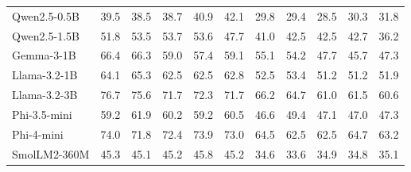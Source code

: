 \documentclass[letterpaper]{article} %
\begin{document}
\begin{table}[t]
{\begin{tabular}{lccccc|ccccc}
Qwen2.5-0.5B & \cellcolor[HTML]{F8DACC}39.5 & \cellcolor[HTML]{F8DACC}38.5 & \cellcolor[HTML]{FADFCC}38.7 & \cellcolor[HTML]{FBE4CC}40.9 & \cellcolor[HTML]{FBE5CC}42.1 & \cellcolor[HTML]{F8D9CC}29.8 & \cellcolor[HTML]{F8DBCC}29.4 & \cellcolor[HTML]{F9DCCC}28.5 & \cellcolor[HTML]{FAE2CC}30.3 & \cellcolor[HTML]{FBE4CC}31.8 \\
Qwen2.5-1.5B & \cellcolor[HTML]{FDECCC}51.8 & \cellcolor[HTML]{FEF2CC}53.5 & \cellcolor[HTML]{FCF1CD}53.7 & \cellcolor[HTML]{FAF1CD}53.6 & \cellcolor[HTML]{FEEDCC}47.7 & \cellcolor[HTML]{FDEACC}41.0 & \cellcolor[HTML]{FEF0CC}42.5 & \cellcolor[HTML]{FFF2CC}42.5 & \cellcolor[HTML]{FCF1CD}42.7 & \cellcolor[HTML]{FDEBCC}36.2 \\
Gemma-3-1B & \cellcolor[HTML]{EFEFCF}66.4 & \cellcolor[HTML]{E9EDD0}66.3 & \cellcolor[HTML]{F4F0CE}59.0 & \cellcolor[HTML]{F4F0CE}57.4 & \cellcolor[HTML]{F3EFCE}59.1 & \cellcolor[HTML]{F3EFCE}55.1 & \cellcolor[HTML]{EEEECF}54.2 & \cellcolor[HTML]{F8F0CD}47.7 & \cellcolor[HTML]{F7F0CD}45.7 & \cellcolor[HTML]{F6F0CE}47.3 \\
Llama-3.2-1B & \cellcolor[HTML]{F3EFCE}64.1 & \cellcolor[HTML]{EBEED0}65.3 & \cellcolor[HTML]{EFEFCF}62.5 & \cellcolor[HTML]{EDEECF}62.5 & \cellcolor[HTML]{EDEECF}62.8 & \cellcolor[HTML]{F6F0CE}52.5 & \cellcolor[HTML]{EFEFCF}53.4 & \cellcolor[HTML]{F2EFCE}51.2 & \cellcolor[HTML]{EFEFCF}51.2 & \cellcolor[HTML]{EFEFCF}51.9 \\
Llama-3.2-3B & \cellcolor[HTML]{E0EBD2}76.7 & \cellcolor[HTML]{DAEAD3}75.6 & \cellcolor[HTML]{E1ECD2}71.7 & \cellcolor[HTML]{DEEBD2}72.3 & \cellcolor[HTML]{E0EBD2}71.7 & \cellcolor[HTML]{E2ECD1}66.2 & \cellcolor[HTML]{DDEBD2}64.7 & \cellcolor[HTML]{E4ECD1}61.0 & \cellcolor[HTML]{DFEBD2}61.5 & \cellcolor[HTML]{E2ECD1}60.6 \\
Phi-3.5-mini & \cellcolor[HTML]{FAF1CD}59.2 & \cellcolor[HTML]{F1EFCF}61.9 & \cellcolor[HTML]{F2EFCE}60.2 & \cellcolor[HTML]{F2EFCE}59.2 & \cellcolor[HTML]{F0EFCF}60.5 & \cellcolor[HTML]{FFF2CC}46.6 & \cellcolor[HTML]{F6F0CE}49.4 & \cellcolor[HTML]{F8F1CD}47.1 & \cellcolor[HTML]{F5F0CE}47.0 & \cellcolor[HTML]{F6F0CE}47.3 \\
Phi-4-mini & \cellcolor[HTML]{E4ECD1}74.0 & \cellcolor[HTML]{E0ECD2}71.8 & \cellcolor[HTML]{E0EBD2}72.4 & \cellcolor[HTML]{DCEBD2}73.9 & \cellcolor[HTML]{DEEBD2}73.0 & \cellcolor[HTML]{E5ECD1}64.5 & \cellcolor[HTML]{E0ECD2}62.5 & \cellcolor[HTML]{E1ECD1}62.5 & \cellcolor[HTML]{DAEAD3}64.7 & \cellcolor[HTML]{DEEBD2}63.2 \\
SmolLM2-360M & \cellcolor[HTML]{FAE2CC}45.3 & \cellcolor[HTML]{FBE5CC}45.1 & \cellcolor[HTML]{FCE9CC}45.2 & \cellcolor[HTML]{FDEBCC}45.8 & \cellcolor[HTML]{FDE9CC}45.2 & \cellcolor[HTML]{FAE0CC}34.6 & \cellcolor[HTML]{FAE1CC}33.6 & \cellcolor[HTML]{FCE6CC}34.9 & \cellcolor[HTML]{FCE9CC}34.8 & \cellcolor[HTML]{FCE9CC}35.1 \\

\end{tabular}}
\end{table}
\end{document}
